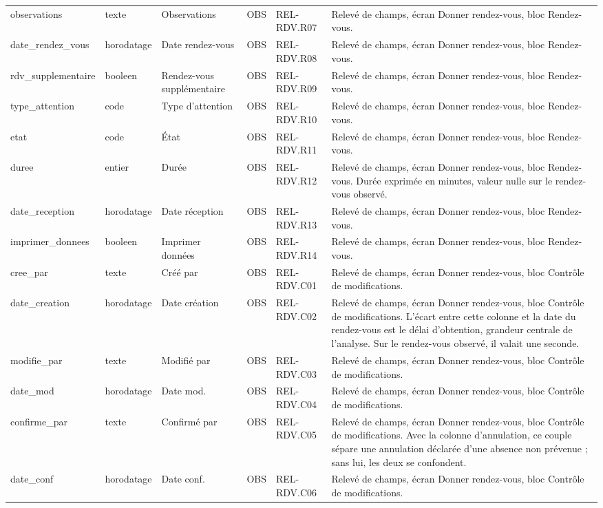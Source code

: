 \begin{longtable}{p{2.5cm}p{1.8cm}p{2.8cm}p{1.3cm}p{2.2cm}p{5cm}}
observations & texte & Observations & OBS & REL-RDV.R07 & Relevé de champs, écran Donner rendez-vous, bloc Rendez-vous. \\
date\_rendez\_vous & horodatage & Date rendez-vous & OBS & REL-RDV.R08 & Relevé de champs, écran Donner rendez-vous, bloc Rendez-vous. \\
rdv\_supplementaire & booleen & Rendez-vous supplémentaire & OBS & REL-RDV.R09 & Relevé de champs, écran Donner rendez-vous, bloc Rendez-vous. \\
type\_attention & code & Type d'attention & OBS & REL-RDV.R10 & Relevé de champs, écran Donner rendez-vous, bloc Rendez-vous. \\
etat & code & État & OBS & REL-RDV.R11 & Relevé de champs, écran Donner rendez-vous, bloc Rendez-vous. \\
duree & entier & Durée & OBS & REL-RDV.R12 & Relevé de champs, écran Donner rendez-vous, bloc Rendez-vous. Durée exprimée en minutes, valeur nulle sur le rendez-vous observé. \\
date\_reception & horodatage & Date réception & OBS & REL-RDV.R13 & Relevé de champs, écran Donner rendez-vous, bloc Rendez-vous. \\
imprimer\_donnees & booleen & Imprimer données & OBS & REL-RDV.R14 & Relevé de champs, écran Donner rendez-vous, bloc Rendez-vous. \\
cree\_par & texte & Créé par & OBS & REL-RDV.C01 & Relevé de champs, écran Donner rendez-vous, bloc Contrôle de modifications. \\
date\_creation & horodatage & Date création & OBS & REL-RDV.C02 & Relevé de champs, écran Donner rendez-vous, bloc Contrôle de modifications. L'écart entre cette colonne et la date du rendez-vous est le délai d'obtention, grandeur centrale de l'analyse. Sur le rendez-vous observé, il valait une seconde. \\
modifie\_par & texte & Modifié par & OBS & REL-RDV.C03 & Relevé de champs, écran Donner rendez-vous, bloc Contrôle de modifications. \\
date\_mod & horodatage & Date mod. & OBS & REL-RDV.C04 & Relevé de champs, écran Donner rendez-vous, bloc Contrôle de modifications. \\
confirme\_par & texte & Confirmé par & OBS & REL-RDV.C05 & Relevé de champs, écran Donner rendez-vous, bloc Contrôle de modifications. Avec la colonne d'annulation, ce couple sépare une annulation déclarée d'une absence non prévenue ; sans lui, les deux se confondent. \\
date\_conf & horodatage & Date conf. & OBS & REL-RDV.C06 & Relevé de champs, écran Donner rendez-vous, bloc Contrôle de modifications. \\

\end{longtable}
